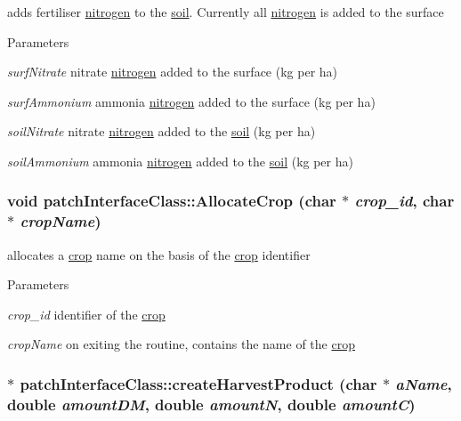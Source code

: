 adds fertiliser \hyperlink{classnitrogen}{nitrogen} to the \hyperlink{classsoil}{soil}. Currently all \hyperlink{classnitrogen}{nitrogen} is added to the surface 
\begin{DoxyParams}{Parameters}
\item[{\em surfNitrate}]nitrate \hyperlink{classnitrogen}{nitrogen} added to the surface (kg per ha) \item[{\em surfAmmonium}]ammonia \hyperlink{classnitrogen}{nitrogen} added to the surface (kg per ha) \item[{\em soilNitrate}]nitrate \hyperlink{classnitrogen}{nitrogen} added to the \hyperlink{classsoil}{soil} (kg per ha) \item[{\em soilAmmonium}]ammonia \hyperlink{classnitrogen}{nitrogen} added to the \hyperlink{classsoil}{soil} (kg per ha) \end{DoxyParams}
\hypertarget{classpatch_interface_class_ae02323c3035b9b3e282b937a77771862}{
\subsubsection[{AllocateCrop}]{\setlength{\rightskip}{0pt plus 5cm}void patchInterfaceClass::AllocateCrop (char $\ast$ {\em crop\_\-id}, \/  char $\ast$ {\em cropName})}}
\label{classpatch_interface_class_ae02323c3035b9b3e282b937a77771862}


allocates a \hyperlink{classcrop}{crop} name on the basis of the \hyperlink{classcrop}{crop} identifier 
\begin{DoxyParams}{Parameters}
\item[{\em crop\_\-id}]identifier of the \hyperlink{classcrop}{crop} \item[{\em cropName}]on exiting the routine, contains the name of the \hyperlink{classcrop}{crop} \end{DoxyParams}
\hypertarget{classpatch_interface_class_a5c6deeeba41629b53acc8a1b990854db}{
\subsubsection[{createHarvestProduct}]{ $\ast$ patchInterfaceClass::createHarvestProduct (char $\ast$ {\em aName}, \/  double {\em amountDM}, \/  double {\em amountN}, \/  double {\em amountC})}}
\label{classpatch_interface_class_a5c6deeeba41629b53acc8a1b990854db}


